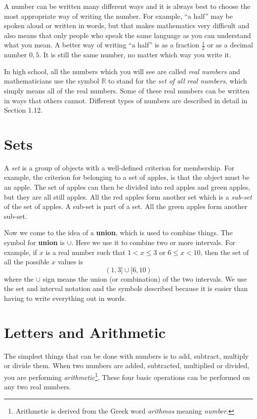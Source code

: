 \documentclass[10pt,a4paper,titlepage,twoside,openright]{report}
\begin{document}
A number can be written many different ways and it is always best to choose the most appropriate way of writing the number. For example, ``a half'' may be spoken aloud or written in words, but that makes mathematics very difficult and also means that only people who speak the same language as you can understand what you mean. A better way of writing ``a half'' is as a fraction $\frac{1}{2}$ or as a decimal number $0,5$. It is still the same number, no matter which way you write it.

In high school, all the numbers which you will see are called \textit{real
numbers} and mathematicians use the symbol $\mathbb R$ to stand for the \textit{set of all real numbers}, which simply means all of the real numbers. Some of these real numbers can be written in ways that others cannot. Different types of numbers are described in detail in Section 1.12.


\section{Sets}
A \textit{set} is a group of objects with a well-defined criterion for membership. For example, the criterion for belonging to a set of apples, is that the object must be an apple. The set of apples can then be divided into red apples and green apples, but they are all still apples. All the red apples form another set which is a \textit{sub-set} of the set of apples. A sub-set is part of a set. All the green apples form another sub-set. 
 
Now we come to the idea of a \textbf{union}, which is used to combine things. The symbol for \textbf{union} is $\cup$. Here we use it to combine two or more intervals. For example, if $x$ is a real number such that $1 < x \leq 3$ or $6 \leq x < 10$, then the set of all the possible $x$ values is
\begin{equation}
  \label{eq:mf:g:interval}
    (1,3]\cup[6,10)
\end{equation}
where the $\cup$ sign means the union (or combination) of the two intervals.  We use the set and interval notation and the symbols described because it is easier than having to write everything out in words.



\section{Letters and Arithmetic}
\label{mfoundation:alg}
The simplest things that can be done with numbers is to add, subtract, multiply or divide them. When two numbers are added, subtracted, multiplied or divided, you are performing \textit{arithmetic}\footnote{Arithmetic is derived from the Greek word \textit{arithmos} meaning \textit{number}.}. These four basic operations can be performed on any two real numbers.
\end{document}
